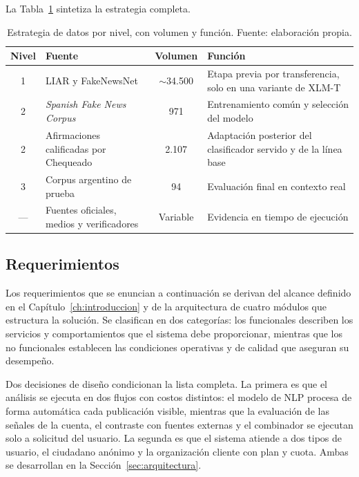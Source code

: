 La Tabla~\ref{tab:estrategia-datos} sintetiza la estrategia completa.

\begin{table}[t]
  \centering
  \small
  \caption{Estrategia de datos por nivel, con volumen y función. Fuente: elaboración propia.}
  \label{tab:estrategia-datos}
  \begin{tabular}{c p{5cm} c p{5cm}}
    \hline
    \textbf{Nivel} & \textbf{Fuente} & \textbf{Volumen} & \textbf{Función} \\
    \hline
    1 & LIAR y FakeNewsNet & $\sim$34.500 & Etapa previa por transferencia, solo en una variante de XLM-T \\
    2 & \textit{Spanish Fake News Corpus} & 971 & Entrenamiento común y selección del modelo \\
    2 & Afirmaciones calificadas por Chequeado & 2.107 & Adaptación posterior del clasificador servido y de la línea base \\
    3 & Corpus argentino de prueba & 94 & Evaluación final en contexto real \\
    --- & Fuentes oficiales, medios y verificadores & Variable & Evidencia en tiempo de ejecución \\
    \hline
  \end{tabular}
\end{table}

\subsection{Requerimientos}
\label{sec:requerimientos}

Los requerimientos que se enuncian a continuación se derivan del alcance definido en el Capítulo~\ref{ch:introduccion} y de la arquitectura de cuatro módulos que estructura la solución. Se clasifican en dos categorías: los funcionales describen los servicios y comportamientos que el sistema debe proporcionar, mientras que los no funcionales establecen las condiciones operativas y de calidad que aseguran su desempeño.

Dos decisiones de diseño condicionan la lista completa. La primera es que el análisis se ejecuta en dos flujos con costos distintos: el modelo de NLP procesa de forma automática cada publicación visible, mientras que la evaluación de las señales de la cuenta, el contraste con fuentes externas y el combinador se ejecutan solo a solicitud del usuario. La segunda es que el sistema atiende a dos tipos de usuario, el ciudadano anónimo y la organización cliente con plan y cuota. Ambas se desarrollan en la Sección~\ref{sec:arquitectura}.

